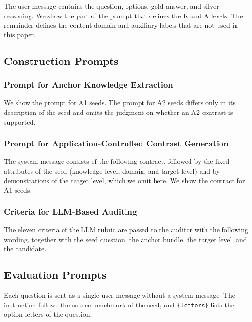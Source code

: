 The user message contains the question, options, gold answer, and silver reasoning.
We show the part of the prompt that defines the K and A levels.
The remainder defines the content domain and auxiliary labels that are not used in this paper.


\subsection{Construction Prompts}

\subsubsection{Prompt for Anchor Knowledge Extraction}

We show the prompt for A1 seeds.
The prompt for A2 seeds differs only in its description of the seed and omits the judgment on whether an A2 contrast is supported.


\subsubsection{Prompt for Application-Controlled Contrast Generation}

The system message consists of the following contract, followed by the fixed attributes of the seed (knowledge level, domain, and target level) and by demonstrations of the target level, which we omit here.
We show the contract for A1 seeds.


\subsubsection{Criteria for LLM-Based Auditing}

The eleven criteria of the LLM rubric are passed to the auditor with the following wording, together with the seed question, the anchor bundle, the target level, and the candidate.


\subsection{Evaluation Prompts}

Each question is sent as a single user message without a system message.
The instruction follows the source benchmark of the seed, and \texttt{\{letters\}} lists the option letters of the question.

